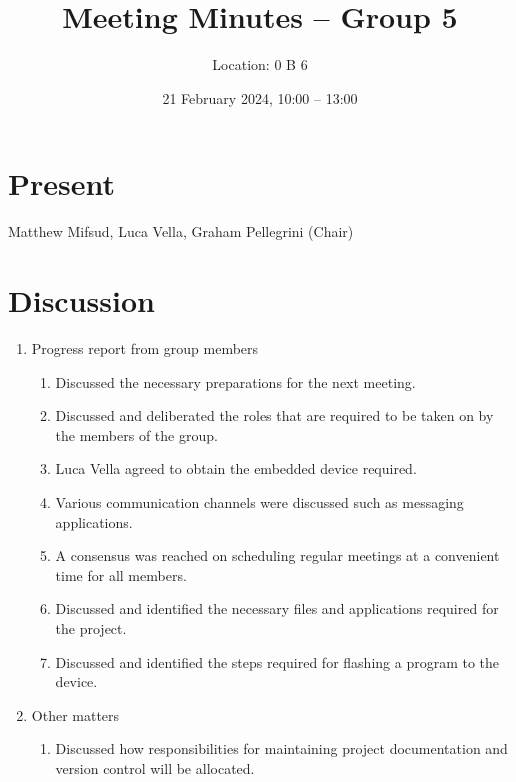 \documentclass{cce2014-meetings}
\title{Meeting Minutes -- Group 5}
\author{Location: 0 B 6}
\date{21 February 2024, 10:00 -- 13:00}
\begin{document}
\maketitle

\section*{Present}
Matthew Mifsud,
Luca Vella,
Graham Pellegrini (Chair)

\section*{Discussion}

\begin{enumerate}


\item Progress report from group members
   \begin{enumerate}
   \item Discussed the necessary preparations for the next meeting.
   \item Discussed and deliberated the roles that are required to be taken on by the members of the group.
   \item Luca Vella agreed to obtain the embedded device required.
   \item Various communication channels were discussed such as messaging applications.
   \item A consensus was reached on scheduling regular meetings at a convenient time for all members.
   \item Discussed and identified the necessary files and applications required for the project.
   \item Discussed and identified the steps required for flashing a program to the device.
   \end{enumerate}
   

\item Other matters
   \begin{enumerate}
   \item Discussed how responsibilities for maintaining project documentation and version control will be allocated.
   \end{enumerate}

\end{enumerate}
\end{document}
